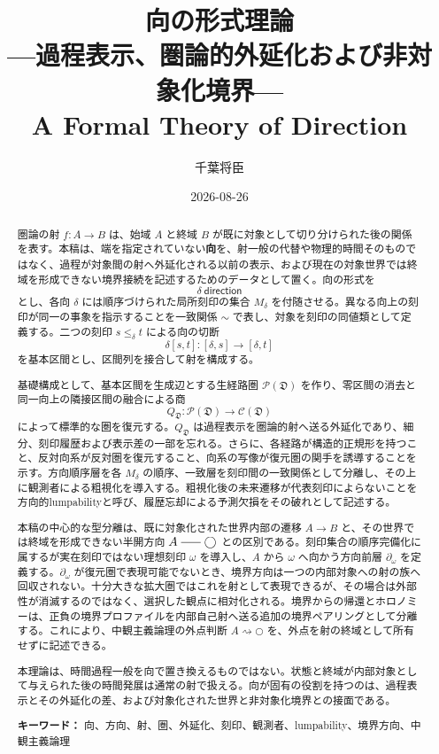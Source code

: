 \documentclass[a4paper,11pt]{ltjsarticle}
\title{向の形式理論\\[0.2em]
  {\Large ---過程表示、圏論的外延化および非対象化境界---}\\[0.4em]
  {\large A Formal Theory of Direction}}
\author{千葉将臣}
\date{2026-08-26}
\theoremstyle{definition}
\theoremstyle{plain}
\newcommand{\dfix}{\bigcirc}
\newcommand{\dline}{\mathrel{\rule[0.55ex]{1.6em}{0.4pt}}}
\begin{document}
\maketitle

\begin{abstract}
圏論の射 $f:A\to B$ は、始域 $A$ と終域 $B$ が既に対象として切り分けられた後の関係を表す。本稿は、端を指定されていない\textbf{向}を、射一般の代替や物理的時間そのものではなく、過程が対象間の射へ外延化される以前の表示、および現在の対象世界では終域を形成できない境界接続を記述するためのデータとして置く。向の形式を
\[
 \delta\ \mathsf{direction}
\]
とし、各向 $\delta$ には順序づけられた局所刻印の集合 $M_\delta$ を付随させる。異なる向上の刻印が同一の事象を指示することを一致関係 $\sim$ で表し、対象を刻印の同値類として定義する。二つの刻印 $s\leq_\delta t$ による向の切断
\[
 \delta[s,t]:[\delta,s]\longrightarrow[\delta,t]
\]
を基本区間とし、区間列を接合して射を構成する。

基礎構成として、基本区間を生成辺とする生経路圏 $\mathcal P(\mathfrak D)$ を作り、零区間の消去と同一向上の隣接区間の融合による商
\[
 Q_{\mathfrak D}:\mathcal P(\mathfrak D)\longrightarrow
 \mathcal C(\mathfrak D)
\]
によって標準的な圏を復元する。$Q_{\mathfrak D}$ は過程表示を圏論的射へ送る外延化であり、細分、刻印履歴および表示差の一部を忘れる。さらに、各経路が構造的正規形を持つこと、反対向系が反対圏を復元すること、向系の写像が復元圏の関手を誘導することを示す。方向順序層を各 $M_\delta$ の順序、一致層を刻印間の一致関係として分離し、その上に観測者による粗視化を導入する。粗視化後の未来遷移が代表刻印によらないことを方向的lumpabilityと呼び、履歴忘却による予測欠損をその破れとして記述する。

本稿の中心的な型分離は、既に対象化された世界内部の遷移 $A\to B$ と、その世界では終域を形成できない半開方向 $A\dline\dfix$ との区別である。刻印集合の順序完備化に属するが実在刻印ではない理想刻印 $\omega$ を導入し、$A$ から $\omega$ へ向かう方向前層 $\partial_\omega$ を定義する。$\partial_\omega$ が復元圏で表現可能でないとき、境界方向は一つの内部対象への射の族へ回収されない。十分大きな拡大圏ではこれを射として表現できるが、その場合は外部性が消滅するのではなく、選択した観点に相対化される。境界からの帰還とホロノミーは、正負の境界プロファイルを内部自己射へ送る追加の境界ペアリングとして分離する。これにより、中観主義論理の外点判断 $A\rightsquigarrow\dfix$ を、外点を射の終域として所有せずに記述できる。

本理論は、時間過程一般を向で置き換えるものではない。状態と終域が内部対象として与えられた後の時間発展は通常の射で扱える。向が固有の役割を持つのは、過程表示とその外延化の差、および対象化された世界と非対象化境界との接面である。

\medskip
\noindent\textbf{キーワード：} 向、方向、射、圏、外延化、刻印、観測者、lumpability、境界方向、中観主義論理
\end{abstract}
\end{document}
